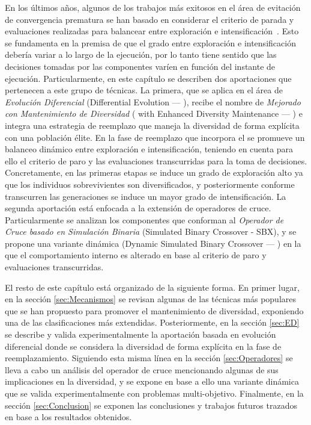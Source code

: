 En los últimos años, algunos de los trabajos más exitosos en el área de evitación de convergencia prematura se han basado en considerar el criterio de parada y evaluaciones
realizadas para balancear entre exploración e intensificación~\cite{segura2016novel}.
%
Esto se fundamenta en la premisa de que el grado entre exploración e intensificación debería variar a lo largo de la ejecución, por lo tanto tiene sentido que las decisiones tomadas por las componentes varíen en función del instante de ejecución.
%
%
Particularmente, en este capítulo se describen dos aportaciones que pertenecen a este grupo de técnicas.
%
La primera, que se aplica en el área de \textit{Evolución Diferencial} (Differential Evolution --- \DE{}), recibe el nombre de \DE{} \textit{Mejorado con Mantenimiento de Diversidad} 
(\DE{} with Enhanced Diversity Maintenance --- \DEEDM{}) e integra una estrategia de reemplazo que maneja la diversidad de forma explícita con una población élite.
%
En la fase de reemplazo que incorpora el \DEEDM{} se promueve un balanceo dinámico entre exploración e intensificación, teniendo en cuenta para ello el criterio de paro
y las evaluaciones transcurridas para la toma de decisiones.
%
Concretamente, en las primeras etapas se induce un grado de exploración alto ya que los individuos sobrevivientes son diversificados, y posteriormente conforme transcurren las 
generaciones se induce un mayor grado de intensificación.
% 
La segunda aportación está enfocada a la extensión de operadores de cruce.
%
Particularmente se analizan los componentes que conforman al \textit{Operador de Cruce basado en Simulación Binaria} (Simulated Binary Crossover - SBX), 
y se propone una variante dinámica (Dynamic Simulated Binary Crossover --- \DSBX{}) en la que el comportamiento interno es alterado en base al criterio de paro y evaluaciones transcurridas.

El resto de este capítulo está organizado de la siguiente forma.
%
En primer lugar, en la sección \ref{sec:Mecanismos} se revisan algunas de las técnicas más populares que se han propuesto para promover el mantenimiento de diversidad, exponiendo una de las clasificaciones más extendidas.
%
Posteriormente, en la sección \ref{sec:ED} se describe y valida experimentalmente la aportación basada en evolución diferencial donde se considera la diversidad de forma explícita en la fase de reemplazamiento.
%
Siguiendo esta misma línea en la sección \ref{sec:Operadores} se lleva a cabo un análisis del operador de cruce \SBX{} mencionando algunas de sus implicaciones en la diversidad, 
y se expone en base a ello una variante dinámica que se valida experimentalmente con problemas multi-objetivo.
%
Finalmente, en la sección \ref{sec:Conclusion} se exponen las conclusiones y trabajos futuros trazados en base a los resultados obtenidos.
%
